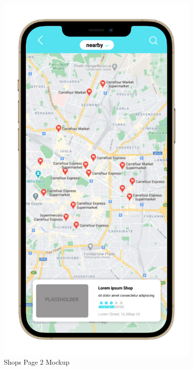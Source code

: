 \begin{figure}
    \centering
    \begin{minipage}{.45\linewidth}
    \includegraphics[width=0.9\textwidth]{Images/UserInterfaces/withiphonephrames/ShopsPage2_iphone12promaxgold_portrait.png}
    \caption{\label{fig:InterfacesDiagram}{Shops Page 2 Mockup}}
\end{minipage}
\hspace{.05\linewidth}
\begin{minipage}{.45\linewidth}

\end{minipage}
\end{figure}
